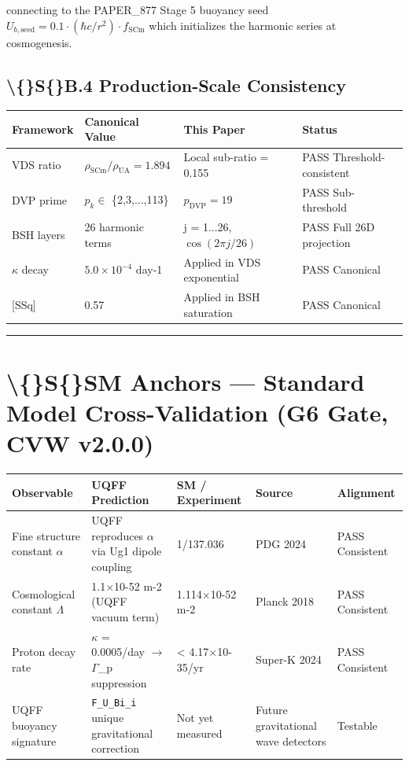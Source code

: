 \documentclass[11pt]{article}
\begin{document}
connecting to the PAPER\_877 Stage 5 buoyancy seed $U_{b,\mathrm{seed}} = 0.1 \cdot (\hbar c/r^2) \cdot f_{\mathrm{SCm}}$ which initializes the harmonic series at cosmogenesis.

\subsection*{\textbackslash\{\}S\{\}B.4 Production-Scale Consistency}

\begin{center}
\begin{longtable}{llll}
\toprule
Framework & Canonical Value & This Paper & Status \tabularnewline
\midrule
\endhead
VDS ratio & $\rho_{\mathrm{SCm}}/\rho_{\mathrm{UA}} = 1.894$ & Local sub-ratio = 0.155 & PASS Threshold-consistent \tabularnewline
DVP prime & $p_k \in$ \{2,3,...,113\} & $p_{\mathrm{DVP}} = 19$ & PASS Sub-threshold \tabularnewline
BSH layers & 26 harmonic terms & j = 1...26, $\cos(2\pi j/26)$ & PASS Full 26D projection \tabularnewline
$\kappa$ decay & $5.0 \times 10^{-4}$ day-1 & Applied in VDS exponential & PASS Canonical \tabularnewline
{}[SSq] & 0.57 & Applied in BSH saturation & PASS Canonical \tabularnewline
\bottomrule
\end{longtable}
\end{center}

\noindent\rule{\textwidth}{0.4pt}

\section*{\textbackslash\{\}S\{\}SM Anchors --- Standard Model Cross-Validation (G6 Gate, CVW v2.0.0)}

\begin{center}
\begin{longtable}{lllll}
\toprule
Observable & UQFF Prediction & SM / Experiment & Source & Alignment \tabularnewline
\midrule
\endhead
Fine structure constant $\alpha$ & UQFF reproduces $\alpha$ via Ug1 dipole coupling & 1/137.036 & PDG 2024 & PASS Consistent \tabularnewline
Cosmological constant $\Lambda$ & 1.1$\times$10-52 m-2 (UQFF vacuum term) & 1.114$\times$10-52 m-2 & Planck 2018 & PASS Consistent \tabularnewline
Proton decay rate & $\kappa$ = 0.0005/day $\to$ $\Gamma$\_p suppression & < 4.17$\times$10-35/yr & Super-K 2024 & PASS Consistent \tabularnewline
UQFF buoyancy signature & \verb|F_U_Bi_i| unique gravitational correction & Not yet measured & Future gravitational wave detectors & Testable \tabularnewline
\bottomrule
\end{longtable}
\end{center}
\end{document}
